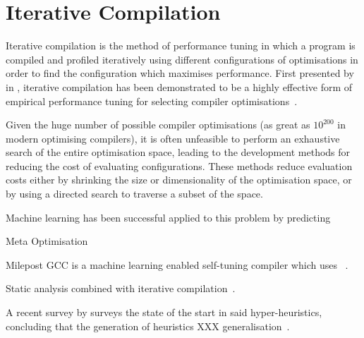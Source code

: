 \section{Iterative Compilation}\label{sec:iterative-compilation}

Iterative compilation is the method of performance tuning in which a
program is compiled and profiled iteratively using different
configurations of optimisations in order to find the configuration
which maximises performance. First presented by \citeauthor{Bodin1998}
in \citeyear{Bodin1998}, iterative compilation has been demonstrated
to be a highly effective form of empirical performance tuning for
selecting compiler optimisations~\cite{Bodin1998}.

%
%

Given the huge number of possible compiler optimisations (as great as
$10^{200}$ in modern optimising compilers), it is often unfeasible to
perform an exhaustive search of the entire optimisation space, leading
to the development methods for reducing the cost of evaluating
configurations. These methods reduce evaluation costs either by
shrinking the size or dimensionality of the optimisation space, or by
using a directed search to traverse a subset of the space.

Machine learning has been successful applied to this problem by
predicting

Meta Optimisation~\cite{Stephenson2003}

Milepost GCC is a machine learning enabled self-tuning compiler which
uses ~\cite{Fursin2011}.

Static analysis combined with iterative compilation~\cite{Runciman2014}.

A recent survey by \citeauthor{Burke2013} surveys the state of the
start in said hyper-heuristics, concluding that the generation of
heuristics XXX generalisation~\cite{Burke2013}.

